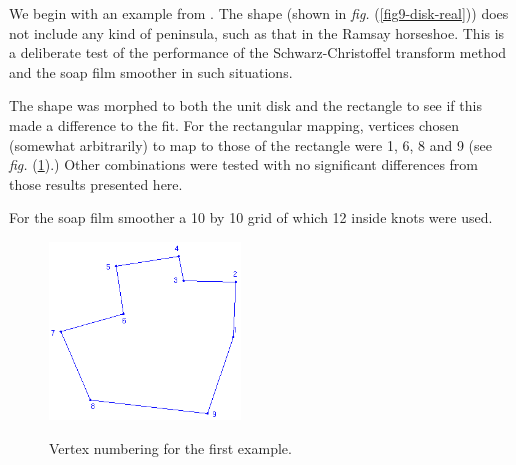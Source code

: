 \documentclass[a4paper,10pt]{amsart}
\newcommand{\sch}{Schwarz-Christoffel }
\newcommand{\fig}[1]{\emph{fig.} (\ref{#1})}
\begin{document}
We begin with an example from \cite{miller09}. The shape (shown in \fig{fig9-disk-real}) does not include any kind of peninsula, such as that in the Ramsay horseshoe. This is a deliberate test of the performance of the \sch transform method and the soap film smoother in such situations. 

The shape was morphed to both the unit disk and the rectangle to see if this made a difference to the fit. For the rectangular mapping, vertices chosen (somewhat arbitrarily) to map to those of the rectangle were 1, 6, 8 and 9 (see \fig{fig9-numbered}.) Other combinations were tested with no significant differences from those results presented here.

For the soap film smoother a 10 by 10 grid of which 12 inside knots were used.

\begin{figure}[tbp]
\centering
\includegraphics[width=2in]{figs-otherdomains/fig9-numbered.png} \\
\caption{Vertex numbering for the first example.}
\label{fig9-numbered}
\end{figure}
\end{document}
